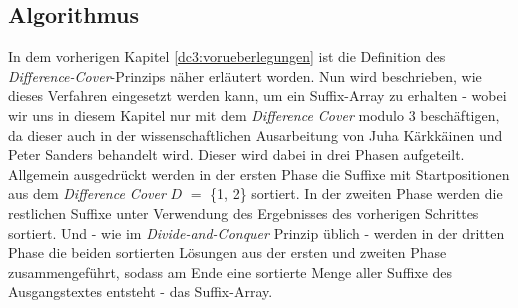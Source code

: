 \subsection{Algorithmus}
\label{dc3:algorithmus}

In dem vorherigen Kapitel \ref{dc3:vorueberlegungen} ist die Definition des \emph{Difference-Cover}-Prinzips näher erläutert worden. Nun wird beschrieben, wie dieses Verfahren eingesetzt werden kann, um ein Suffix-Array zu erhalten - wobei wir uns in diesem Kapitel nur mit dem \emph{Difference Cover} modulo $3$ beschäftigen, da dieser auch in der wissenschaftlichen Ausarbeitung von Juha Kärkkäinen und Peter Sanders behandelt wird. Dieser wird dabei in drei Phasen aufgeteilt. Allgemein ausgedrückt werden in der ersten Phase die Suffixe mit Startpositionen aus dem \emph{Difference Cover} \(D\) $=$ \{1, 2\} sortiert. In der zweiten Phase werden die restlichen Suffixe unter Verwendung des Ergebnisses des vorherigen Schrittes sortiert. Und - wie im \emph{Divide-and-Conquer} Prinzip üblich - werden in der dritten Phase die beiden sortierten Lösungen aus der ersten und zweiten Phase zusammengeführt, sodass am Ende eine sortierte Menge aller Suffixe des Ausgangstextes entsteht - das Suffix-Array.





